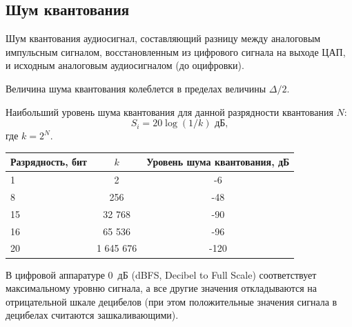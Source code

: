 \documentclass{beamer}
\begin{document}
\subsection{Шум квантования}
\begin{frame}
\begin{block}{Шум квантования}
аудиосигнал, составляющий разницу между аналоговым импульсным сигналом, восстановленным из цифрового сигнала на выходе ЦАП, и исходным аналоговым аудиосигналом (до оцифровки).
\end{block}
\end{frame}
\begin{frame}
Величина шума квантования колеблется в пределах величины $\Delta/2$.

Наибольший уровень шума квантования для данной разрядности квантования $N$:
\[S_i=20 \log(1/k)\text{~дБ,}\]
где $k=2^N$. 
\begin{table}[ht]
  \begin{center}
  \begin{tabular}{|l|c|c|}
  \hline Разрядность, бит & $k$ & Уровень шума квантования, дБ\\
  \hline 1 & 2 & -6 \\  
  \hline 8 & 256 & -48 \\
  \hline 15 & 32 768 & -90 \\
  \hline 16 & 65 536 & -96 \\
  \hline 20 & 1 645 676 & -120 \\ 
  \hline
  \end{tabular}
  \end{center}  
\end{table}
В цифровой аппаратуре 0~дБ (dBFS, Decibel to Full Scale) соответствует максимальному уровню сигнала, а все другие значения откладываются на отрицательной шкале децибелов (при этом положительные значения сигнала в децибелах считаются зашкаливающими).
\end{frame}
\end{document}
